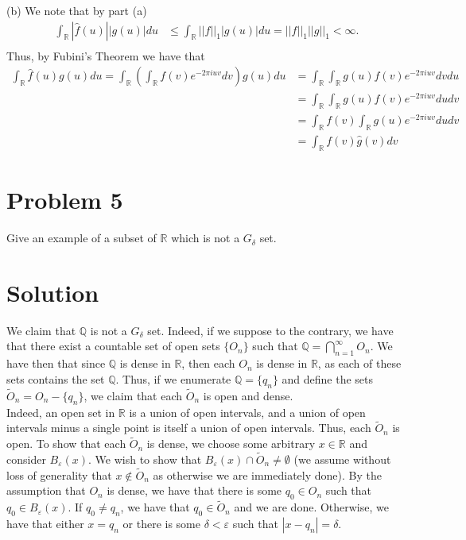 \documentclass{article}
\begin{document}
\noindent (b) We note that by part (a)
\begin{align*}
\int_\mathbb{R}|\hat{f}(u)||g(u)|du&\leq\int_\mathbb{R}||f||_1|g(u)|du=||f||_1||g||_1<\infty.\\
\end{align*}
Thus, by Fubini's Theorem we have that 
\begin{align*}
\int_\mathbb{R}\hat{f}(u)g(u)du=\int_\mathbb{R}\left(\int_\mathbb{R}f(v)e^{-2\pi iuv}dv\right)g(u)du&=\int_\mathbb{R}\int_\mathbb{R}g(u)f(v)e^{-2\pi iuv}dvdu\\
&=\int_\mathbb{R}\int_\mathbb{R}g(u)f(v)e^{-2\pi iuv}dudv\\
&=\int_\mathbb{R}f(v)\int_\mathbb{R}g(u)e^{-2\pi iuv}dudv\\
&=\int_\mathbb{R}f(v)\hat{g}(v)dv
\end{align*}

\section*{Problem 5}
Give an example of a subset of $\mathbb{R}$ which is not a $G_\delta$ set.

\section*{Solution}
We claim that $\mathbb{Q}$ is not a $G_\delta$ set.  Indeed, if we suppose to the contrary, we have that there exist a countable set of open sets $\{O_n\}$ such that $\mathbb{Q}=\bigcap_{n=1}^\infty O_n$.  We have then that since $\mathbb{Q}$ is dense in $\mathbb{R}$, then each $O_n$ is dense in $\mathbb{R}$, as each of these sets contains the set $\mathbb{Q}$.  Thus, if we enumerate $\mathbb{Q}=\{q_n\}$ and define the sets $\tilde{O}_n=O_n-\{q_n\}$, we claim that each $\tilde{O}_n$ is open and dense.\\

\noindent Indeed, an open set in $\mathbb{R}$ is a union of open intervals, and a union of open intervals minus a single point is itself a union of open intervals.  Thus, each $\tilde{O}_n$ is open.  To show that each $\tilde{O}_n$ is dense, we choose some arbitrary $x\in\mathbb{R}$ and consider $B_\varepsilon(x)$.  We wish to show that $B_\varepsilon(x)\cap\tilde{O}_n\neq\emptyset$ (we assume without loss of generality that $x\not\in\tilde{O}_n$ as otherwise we are immediately done).  By the assumption that $O_n$ is dense, we have that there is some $q_0\in O_n$ such that $q_0\in B_\varepsilon(x)$.  If $q_0\neq q_n$, we have that $q_0\in\tilde{O}_n$ and we are done.  Otherwise, we have that either $x=q_n$ or there is some $\delta<\varepsilon$ such that $|x-q_n|=\delta$. \\
\end{document}
